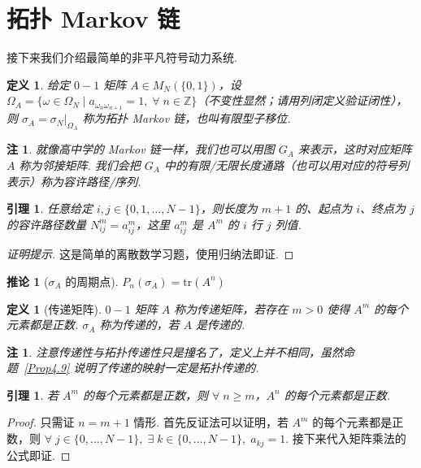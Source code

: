 \documentclass[11pt, a4paper, oneside]{ctexart}
\newtheorem{corollary}[theorem]{推论}
\newtheorem{definition}[theorem]{定义}
\newtheorem{lemma}[theorem]{引理}
\newtheorem{remark}[theorem]{注}
\newcommand{\Z}{\mathbb{Z}}
\newcommand{\tr}{\mathrm{tr}}
\begin{document}
    \section{拓扑 Markov 链}
    接下来我们介绍最简单的非平凡符号动力系统.
    \begin{definition}
        给定 $0-1$ 矩阵 $A\in M_N(\{0,1\})$，设 $\Omega_A=\{\omega\in\Omega_N\mid a_{\omega_n\omega_{n+1}}=1,\; \forall\; n\in\Z\}$（不变性显然；请用列闭定义验证闭性），则 $\sigma_A=\sigma_N|_{\Omega_A}$ 称为拓扑 Markov 链，也叫有限型子移位.
    \end{definition}
    \begin{remark}
        就像高中学的 Markov 链一样，我们也可以用图 $G_A$ 来表示，这时对应矩阵 $A$ 称为邻接矩阵. 我们会把 $G_A$ 中的有限/无限长度通路（也可以用对应的符号列表示）称为容许路径/序列.
    \end{remark}

    \begin{lemma}
        任意给定 $i,j\in\{0,1,\ldots,N-1\}$，则长度为 $m+1$ 的、起点为 $i$、终点为 $j$ 的容许路径数量 $N_{ij}^{m}=a_{ij}^{m}$，这里 $a_{ij}^{m}$ 是 $A^m$ 的 $i$ 行 $j$ 列值.
    \end{lemma}
    \begin{proof}[证明提示]
        这是简单的离散数学习题，使用归纳法即证.
    \end{proof}

    \begin{corollary}[$\sigma_A$ 的周期点]\label{Cor4.4}
        $P_n(\sigma_A)=\tr(A^n)$
    \end{corollary}

    \begin{definition}[传递矩阵]
        $0-1$ 矩阵 $A$ 称为传递矩阵，若存在 $m>0$ 使得 $A^m$ 的每个元素都是正数. $\sigma_A$ 称为传递的，若 $A$ 是传递的.
    \end{definition}
    \begin{remark}
        注意传递性与拓扑传递性只是撞名了，定义上并不相同，虽然命题~\ref{Prop4.9} 说明了传递的映射一定是拓扑传递的.
    \end{remark}

    \begin{lemma}\label{Lemma4.7}
        若 $A^m$ 的每个元素都是正数，则 $\forall\; n\geq m$，$A^n$ 的每个元素都是正数.
    \end{lemma}
    \begin{proof}
        只需证 $n=m+1$ 情形. 首先反证法可以证明，若 $A^m$ 的每个元素都是正数，则 $\forall\; j\in\{0,\ldots,N-1\},\; \exists\; k\in \{0,\ldots,N-1\},\; a_{kj}=1$. 接下来代入矩阵乘法的公式即证.
    \end{proof}
\end{document}
